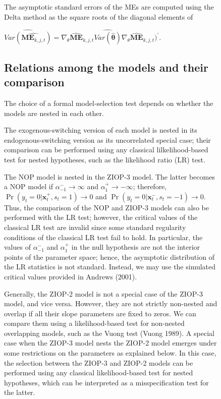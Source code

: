\documentclass[letterpaper,fleqn,12pt]{article}
\begin{document}
\begin{figure}[H]
\begin{onehalfspace}
The asymptotic standard errors of the MEs are computed using the Delta
method as the square roots of the diagonal elements of

\begin{center}
$\widehat{Var(\widehat{\underset{}{\mathbf{ME}_{k,j,t}}})}=\nabla _{\theta }%
\widehat{\mathbf{ME}}_{k,j,t}\widehat{Var(\widehat{\mathbf{\theta }})}\nabla
_{\theta }\widehat{\mathbf{ME}}_{k,j,t})^{\prime }$.
\end{center}

\subsection{\noindent Relations among the models and their comparison}

The choice of a formal model-selection test depends on whether the models
are nested in each other.

The exogenous-switching version of each model is nested in its
endogenous-switching version as its uncorrelated special case; their
comparison can be performed using any classical lilkelihood-based test for
nested hypotheses, such as the likelihood ratio (LR) test.

The NOP model is nested in the ZIOP-3 model. The latter becomes a NOP model
if $\alpha _{-1}^{-}\rightarrow \infty $ and $\alpha _{1}^{+}\rightarrow
-\infty $; therefore, $\Pr (y_{t}=0|\mathbf{x}_{t}^{+},s_{t}=1)\rightarrow 0$
and $\Pr (y_{t}=0|\mathbf{x}_{t}^{-},s_{t}=-1)\rightarrow 0$. Thus, the
comparison of the NOP and ZIOP-3 models can also be performed with the LR
test; however, the critical values of the classical LR test are invalid
since some standard regularity conditions of the classical LR test fail to
hold. In particular, the values of $\alpha _{-1}^{-}$ and $\alpha _{1}^{+}$
in the null hypothesis are not the interior points of the parameter space;
hence, the asymptotic distribution of the LR statistics is not standard.
Instead, we may use the simulated critical values provided in Andrews (2001).

Generally, the ZIOP-2 model is not a special case of the ZIOP-3 model, and
vice versa. However, they are not strictly non-nested and overlap if all
their slope parameters are fixed to zeros. We can compare them using a
likelihood-based test for non-nested overlapping models, such as the Vuong
test (Vuong 1989). A special case when the ZIOP-3 model nests the ZIOP-2
model emerges under some restrictions on the parameters as explained below.
In this case, the selection between the ZIOP-3 and ZIOP-2 models can be
performed using any classical likelihood-based test for nested hypotheses,
which can be interpreted as a misspecification test for the latter.


\end{onehalfspace}
\end{figure}
\end{document}
